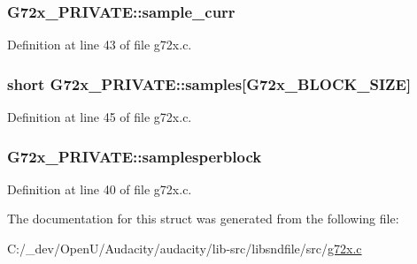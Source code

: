 \subsubsection[{\texorpdfstring{sample\+\_\+curr}{sample_curr}}]{ G72x\+\_\+\+P\+R\+I\+V\+A\+T\+E\+::sample\+\_\+curr}\hypertarget{struct_g72x___p_r_i_v_a_t_e_af8f5f66228fb32e7f536baa1f65a61d9}{}\label{struct_g72x___p_r_i_v_a_t_e_af8f5f66228fb32e7f536baa1f65a61d9}


Definition at line 43 of file g72x.\+c.

\subsubsection[{\texorpdfstring{samples}{samples}}]{\setlength{\rightskip}{0pt plus 5cm}short G72x\+\_\+\+P\+R\+I\+V\+A\+T\+E\+::samples\mbox{[}{\bf G72x\+\_\+\+B\+L\+O\+C\+K\+\_\+\+S\+I\+ZE}\mbox{]}}\hypertarget{struct_g72x___p_r_i_v_a_t_e_ab5dfa16f7fdc58697fe6b92da394ad46}{}\label{struct_g72x___p_r_i_v_a_t_e_ab5dfa16f7fdc58697fe6b92da394ad46}


Definition at line 45 of file g72x.\+c.

\subsubsection[{\texorpdfstring{samplesperblock}{samplesperblock}}]{ G72x\+\_\+\+P\+R\+I\+V\+A\+T\+E\+::samplesperblock}\hypertarget{struct_g72x___p_r_i_v_a_t_e_a9fb2ff31332b422f68088dc62727d313}{}\label{struct_g72x___p_r_i_v_a_t_e_a9fb2ff31332b422f68088dc62727d313}


Definition at line 40 of file g72x.\+c.



The documentation for this struct was generated from the following file\+:\begin{DoxyCompactItemize}
\item 
C\+:/\+\_\+dev/\+Open\+U/\+Audacity/audacity/lib-\/src/libsndfile/src/\hyperlink{g72x_8c}{g72x.\+c}\end{DoxyCompactItemize}
